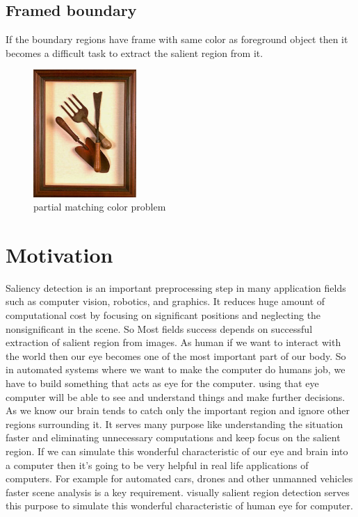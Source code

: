 
\subsection{Framed boundary}
If the boundary regions have frame with same color as foreground object then it becomes a difficult task to extract the salient region from it.

\begin{figure}[here]
  \centering
  \includegraphics[width=0.35\textwidth,height=0.5\textwidth]{pictures/fork.jpg}
  
  \caption{partial matching color problem \protect\footnotemark}
  
  \label{partial matching color}

\end{figure} 


\section{Motivation}
Saliency detection is an important preprocessing step in many application fields such as computer vision, robotics, and graphics. It reduces huge amount of computational cost by focusing on significant positions and neglecting the nonsignificant in the scene. So Most fields success depends on successful extraction of salient region from images. As human if we want to interact with the world then our eye becomes one of the most important part of our body. So in automated systems where we want to make the computer do humans job, we have to build something that acts as eye for the computer. using that eye computer will be able to see and understand things and make further decisions. As we know our brain tends to catch only the important region and ignore other regions surrounding it. It serves many purpose like understanding the situation faster and eliminating unnecessary computations and keep focus on the salient region. If we can simulate this wonderful characteristic of our eye and brain into a computer then it's going to be very helpful in real life applications of computers. For example for automated cars, drones and other unmanned vehicles faster scene analysis is a key requirement. visually salient region detection serves this purpose to simulate this wonderful characteristic of human eye for computer.

